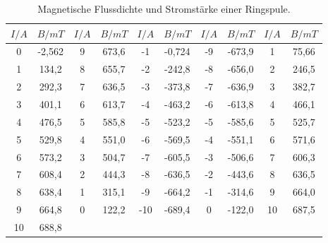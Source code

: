 \begin{table}[H]
  \centering
  \caption{Magnetische Flussdichte und Stromstärke einer Ringspule.}
  \begin{tabular}{c c | c c | c c | c c | c c}
    \toprule
     $I/A$ & $B/mT$ &$I/A$ & $B/mT$ & $I/A$ & $B/mT$ &$I/A$ & $B/mT$ & $I/A$ & $B/mT$  \\
    \midrule
    0 &-2,562 & 9 & 673,6 & -1 & -0,724 & -9 & -673,9 & 1 & 75,66\\
    1 & 134,2 & 8 & 655,7 & -2 & -242,8 & -8 & -656,0 & 2 & 246,5\\
    2 & 292,3 & 7 & 636,5 & -3 & -373,8 & -7 & -636,9 & 3 & 382,7\\
    3 & 401,1 & 6 & 613,7 & -4 & -463,2 & -6 & -613,8 & 4 & 466,1\\
    4 & 476,5 & 5 & 585,8 & -5 & -523,2 & -5 & -585,6 & 5 & 525,7\\
    5 & 529,8 & 4 & 551,0 & -6 & -569,5 & -4 & -551,1 & 6 & 571,6\\
    6 & 573,2 & 3 & 504,7 & -7 & -605,5 & -3 & -506,6 & 7 & 606,3\\
    7 & 608,4 & 2 & 444,3 & -8 & -636,5 & -2 & -443,6 & 8 & 636,5\\
    8 & 638,4 & 1 & 315,1 & -9 & -664,2 & -1 & -314,6 & 9 & 664,0\\
    9 & 664,8 & 0 & 122,2 & -10 & -689,4 & 0 & -122,0 & 10 & 687,5\\
    10 & 688,8 \\
   
    
  \bottomrule
  \end{tabular}
\end{table}

